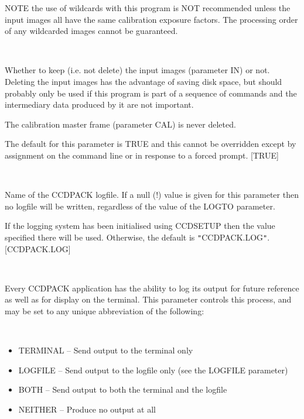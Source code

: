 \documentclass[twoside,11pt]{article}
\newcommand{\htmlref}[2]{#1}
\renewcommand{\_}{\texttt{\symbol{95}}}
\newcommand{\qt}[1]{{\tt "}#1{\tt "}}
\newcommand{\xroutine}[1]{\htmlref{{\sc #1}}{#1}}
\newcommand{\sstsubsection}[1]{ \item[{#1}] \mbox{} \\}
\newcommand{\sstitemlist}[1]{
  \mbox{} \\
  \vspace{-3.5ex}
  \begin{itemize}
     #1
  \end{itemize}
}
\newcommand{\sstitem}{\item}
\newcommand{\sstsubsection}[1]{\item[{#1}]}
\newcommand{\sstitemlist}[1]{
      \begin{itemize}
         #1
      \end{itemize}
      \\
   }
\newcommand{\sstitem}{\item}
\begin{document}
{{{         NOTE the use of wildcards with this program is NOT recommended
         unless the input images all have the same calibration exposure
         factors. The processing order of any wildcarded images cannot
         be guaranteed.
      }
      \sstsubsection{
         KEEPIN = \_LOGICAL (Read)
      } {
         Whether to keep (i.e. not delete) the input images (parameter IN)
         or not. Deleting the input images has the advantage of saving
         disk space, but should probably only be used if this program
         is part of a sequence of commands and the intermediary data
         produced by it are not important.

         The calibration master frame (parameter CAL) is never deleted.

         The default for this parameter is TRUE and this cannot be
         overridden except by assignment on the command line or in
         response to a forced prompt.
         [TRUE]
      }
      \sstsubsection{
         LOGFILE = FILENAME (Read)
      } {
         Name of the CCDPACK logfile.  If a null (!) value is given for
         this parameter then no logfile will be written, regardless of
         the value of the LOGTO parameter.

         If the logging system has been initialised using \xroutine{CCDSETUP}
         then the value specified there will be used. Otherwise, the
         default is \qt{CCDPACK.LOG}.
         [CCDPACK.LOG]
      }
      \sstsubsection{
         LOGTO = LITERAL (Read)
      } {
         Every CCDPACK application has the ability to log its output
         for future reference as well as for display on the terminal.
         This parameter controls this process, and may be set to any
         unique abbreviation of the following:
         \sstitemlist{

            \sstitem
               TERMINAL  -- Send output to the terminal only

            \sstitem
               LOGFILE   -- Send output to the logfile only (see the
                               LOGFILE parameter)

            \sstitem
               BOTH      -- Send output to both the terminal and the
                               logfile

            \sstitem
               NEITHER   -- Produce no output at all

}}}}
\end{document}
